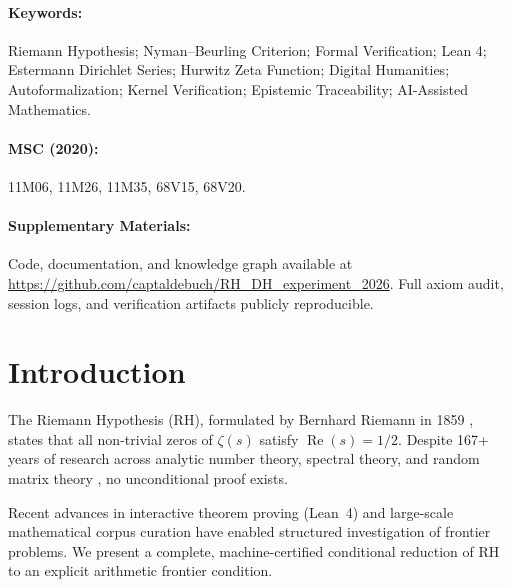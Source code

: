 \documentclass[11pt,a4paper]{article}
\theoremstyle{plain}
\theoremstyle{definition}
\theoremstyle{remark}
\DeclareMathOperator{\RePart}{Re}
\renewcommand{\Re}{\RePart}
\begin{document}
\paragraph{Keywords:} Riemann Hypothesis; Nyman--Beurling Criterion; Formal Verification; Lean 4; Estermann Dirichlet Series; Hurwitz Zeta Function; Digital Humanities; Autoformalization; Kernel Verification; Epistemic Traceability; AI-Assisted Mathematics.

\paragraph{MSC (2020):} 11M06, 11M26, 11M35, 68V15, 68V20.

\paragraph{Supplementary Materials:} Code, documentation, and knowledge graph available at \url{https://github.com/captaldebuch/RH_DH_experiment_2026}. Full axiom audit, session logs, and verification artifacts publicly reproducible.

\section{Introduction}
\label{sec:intro}

The Riemann Hypothesis (RH), formulated by Bernhard Riemann in 1859 \cite{Riemann1859}, states that all non-trivial zeros of $\zeta(s)$ satisfy $\Re(s) = 1/2$. Despite 167+ years of research across analytic number theory, spectral theory, and random matrix theory \cite{IwaniecKowalski2004,MontgomeryVaughan2007,Tenenbaum2015}, no unconditional proof exists.

Recent advances in interactive theorem proving (Lean~4) \cite{MouraUllrich2021} and large-scale mathematical corpus curation have enabled structured investigation of frontier problems. We present a complete, machine-certified conditional reduction of RH to an explicit arithmetic frontier condition.
\end{document}
